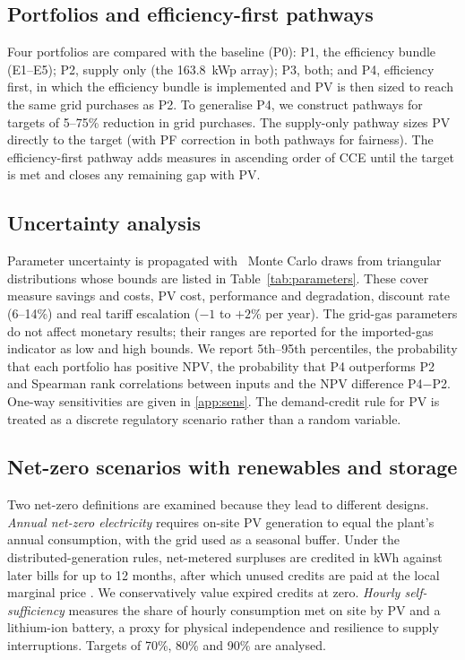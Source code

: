 \documentclass[preprint,12pt,authoryear]{elsarticle}
\begin{document}
\subsection{Portfolios and efficiency-first pathways}
Four portfolios are compared with the baseline (P0): P1, the efficiency bundle (E1--E5); P2, supply only (the 163.8~kWp array); P3, both; and P4, efficiency first, in which the efficiency bundle is implemented and PV is then sized to reach the same grid purchases as P2. To generalise P4, we construct pathways for targets of 5--75\% reduction in grid purchases. The supply-only pathway sizes PV directly to the target (with PF correction in both pathways for fairness). The efficiency-first pathway adds measures in ascending order of CCE until the target is met and closes any remaining gap with PV.

\subsection{Uncertainty analysis}
Parameter uncertainty is propagated with \nMCN\ Monte Carlo draws from triangular distributions whose bounds are listed in Table~\ref{tab:parameters}. These cover measure savings and costs, PV cost, performance and degradation, discount rate (6--14\%) and real tariff escalation ($-1$ to $+2$\% per year). The grid-gas parameters do not affect monetary results; their ranges are reported for the imported-gas indicator as low and high bounds. We report 5th--95th percentiles, the probability that each portfolio has positive NPV, the probability that P4 outperforms P2 and Spearman rank correlations between inputs and the NPV difference P4$-$P2. One-way sensitivities are given in \ref{app:sens}. The demand-credit rule for PV is treated as a discrete regulatory scenario rather than a random variable.

\subsection{Net-zero scenarios with renewables and storage}
\label{sec:nzmethod}
Two net-zero definitions are examined because they lead to different designs. \emph{Annual net-zero electricity} requires on-site PV generation to equal the plant's annual consumption, with the grid used as a seasonal buffer. Under the distributed-generation rules, net-metered surpluses are credited in kWh against later bills for up to 12 months, after which unused credits are paid at the local marginal price \citep{cre2017dg}. We conservatively value expired credits at zero. \emph{Hourly self-sufficiency} measures the share of hourly consumption met on site by PV and a lithium-ion battery, a proxy for physical independence and resilience to supply interruptions. Targets of 70\%, 80\% and 90\% are analysed.
\end{document}
